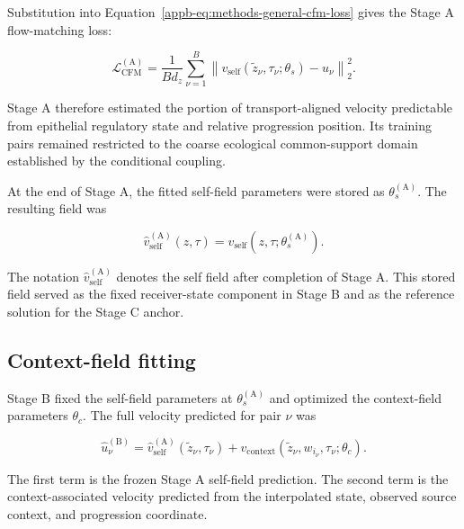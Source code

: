 Substitution into
Equation~\ref{appb-eq:methods-general-cfm-loss} gives the Stage A flow-matching
loss:

\begin{equation}
\mathcal{L}_{\mathrm{CFM}}^{(\mathrm{A})}
=
\frac{1}{B d_z}
\sum_{\nu=1}^{B}
\left\|
v_{\mathrm{self}}
\left(
\widetilde{z}_\nu,
\tau_\nu;
\theta_s
\right)
-
u_\nu
\right\|_2^2.
\label{appb-eq:methods-stage-a-cfm}
\end{equation}

Stage A therefore estimated the portion of transport-aligned velocity
predictable from epithelial regulatory state and relative progression
position. Its training pairs remained restricted to the coarse ecological
common-support domain established by the conditional coupling.

At the end of Stage A, the fitted self-field parameters were stored as
\(\theta_s^{(\mathrm{A})}\). The resulting field was

\begin{equation}
\widehat{v}_{\mathrm{self}}^{(\mathrm{A})}(z,\tau)
=
v_{\mathrm{self}}
\left(
z,\tau;
\theta_s^{(\mathrm{A})}
\right).
\label{appb-eq:methods-stage-a-field}
\end{equation}

The notation
\(\widehat{v}_{\mathrm{self}}^{(\mathrm{A})}\) denotes the self field after
completion of Stage A. This stored field served as the fixed receiver-state
component in Stage B and as the reference solution for the Stage C anchor.

\subsection{Context-field fitting}
\label{appb-sec:methods-training-stage-b}

Stage B fixed the self-field parameters at
\(\theta_s^{(\mathrm{A})}\) and optimized the context-field parameters
\(\theta_c\). The full velocity predicted for pair \(\nu\) was

\begin{equation}
\widehat{u}_\nu^{(\mathrm{B})}
=
\widehat{v}_{\mathrm{self}}^{(\mathrm{A})}
\left(
\widetilde{z}_\nu,
\tau_\nu
\right)
+
v_{\mathrm{context}}
\left(
\widetilde{z}_\nu,
w_{i_\nu},
\tau_\nu;
\theta_c
\right).
\label{appb-eq:methods-stage-b-prediction}
\end{equation}

The first term is the frozen Stage A self-field prediction. The second term is
the context-associated velocity predicted from the interpolated state,
observed source context, and progression coordinate.

